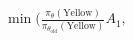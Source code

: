\documentclass[preview]{standalone}
\begin{document}
\begin{align*}
\min \big(\frac{\pi_\theta(\text{Yellow})}{\pi_{\theta_{\text{old}}}(\text{Yellow})} A_1,
\end{align*}
\end{document}

